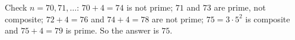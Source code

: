 Check $n=70,71,\dots$: $70+4=74$ is not prime; $71$ and $73$ are prime, not composite; $72+4=76$ and $74+4=78$ are not prime; $75=3\cdot5^2$ is composite and $75+4=79$ is prime. So the answer is $\boxed{75}$.
